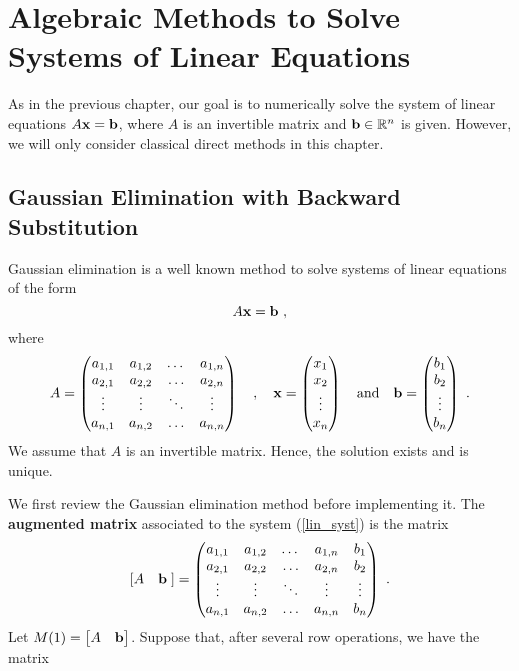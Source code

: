 \chapter{Algebraic Methods to Solve Systems of Linear Equations}
\label{chaptSeqC}

As in the previous chapter, our goal is to numerically solve the
system of linear equations $A \mathbf{x} = \mathbf{b}$, where
$A$ is an invertible \nn matrix and $\mathbf{b} \in \mathbb{R}^n$ is given.
However, we will only consider classical direct methods in this chapter.

\section{Gaussian Elimination with Backward Substitution}

Gaussian elimination is a well known method to solve systems of linear
equations of the form
\begin{equation}\label{lin_syst}
A\mathbf{x}=\mathbf{b} \ ,
\end{equation}
where
\[
A = \begin{pmatrix}
a_{1,1} & a_{1,2} & \dots & a_{1,n} \\
a_{2,1} & a_{2,2} & \ldots & a_{2,n} \\
\vdots & \vdots & \ddots & \vdots \\   %
a_{n,1} & a_{n,2} & \ldots & a_{n,n}
\end{pmatrix}
\quad , \quad
\VEC{x} = \begin{pmatrix}
x_1 \\ x_2 \\ \vdots \\ x_n
\end{pmatrix}
\quad \text{and} \quad
\VEC{b} = \begin{pmatrix}
b_1 \\ b_2 \\ \vdots \\ b_n
\end{pmatrix} \ .
\]
We assume that $A$ is an invertible matrix.  Hence, the solution
exists and is unique.

We first review the Gaussian elimination method before implementing it.
The {\bfseries augmented matrix}
associated to the system (\ref{lin_syst}) is the matrix
\[
[A\quad \mathbf{b}\;] = \begin{pmatrix}
a_{1,1} & a_{1,2} & \dots & a_{1,n} & b_1 \\
a_{2,1} & a_{2,2} & \ldots & a_{2,n} & b_2\\
\vdots & \vdots & \ddots & \vdots & \vdots \\
a_{n,1} & a_{n,2} & \ldots & a_{n,n} & b_n
\end{pmatrix}  \ .
\]
Let $M(1) = \begin{bmatrix} A & \mathbf{b} \end{bmatrix}$.  Suppose that,
after several row operations, we have the matrix

